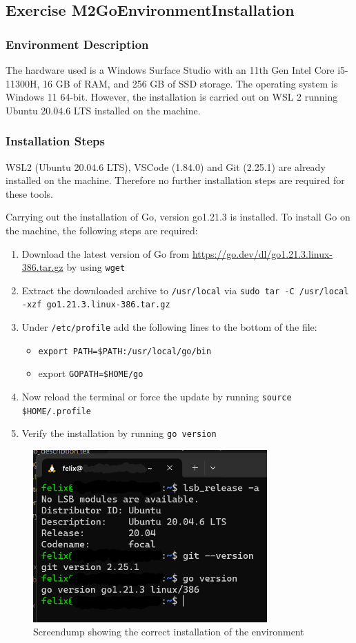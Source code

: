 \label{sec:exercise_install_go_env}

\subsection{Exercise M2GoEnvironmentInstallation}
\label{sec:exercise_m2go_environment_installation}

\subsubsection*{Environment Description}
The hardware used is a Windows Surface Studio with an 11th Gen Intel Core i5-11300H, 16 GB of RAM, and 256 GB of SSD storage.
The operating system is Windows 11 64-bit. However, the installation is carried out on WSL 2 running Ubuntu 20.04.6 LTS installed on the machine.

\subsubsection*{Installation Steps}
WSL2 (Ubuntu 20.04.6 LTS), VSCode (1.84.0) and Git (2.25.1) are already installed on the machine. Therefore no further installation steps are required for these tools.

Carrying out the installation of Go, version go1.21.3 is installed.
To install Go on the machine, the following steps are required:
\begin{enumerate}
    \item Download the latest version of Go from \url{https://go.dev/dl/go1.21.3.linux-386.tar.gz} by using  \texttt{wget}
    \item Extract the downloaded archive to \texttt{/usr/local} via \texttt{sudo tar -C /usr/local -xzf go1.21.3.linux-386.tar.gz}
    \item Under \texttt{/etc/profile} add the following lines to the bottom of the file: 
    \begin{itemize}
        \item \texttt{export PATH=\$PATH:/usr/local/go/bin}
        \item export \texttt{GOPATH=\$HOME/go}
    \end{itemize}
    \item Now reload the terminal or force the update by running \texttt{source \$HOME/.profile}
    \item Verify the installation by running \texttt{go version}
\end{enumerate}

\begin{figure}
	\centering
	\includegraphics[width=0.8\textwidth]{figures/goLang/installation_screendump.png}
	\caption{Screendump showing the correct installation of the environment}
	\label{fig:screendump_installation}
\end{figure}